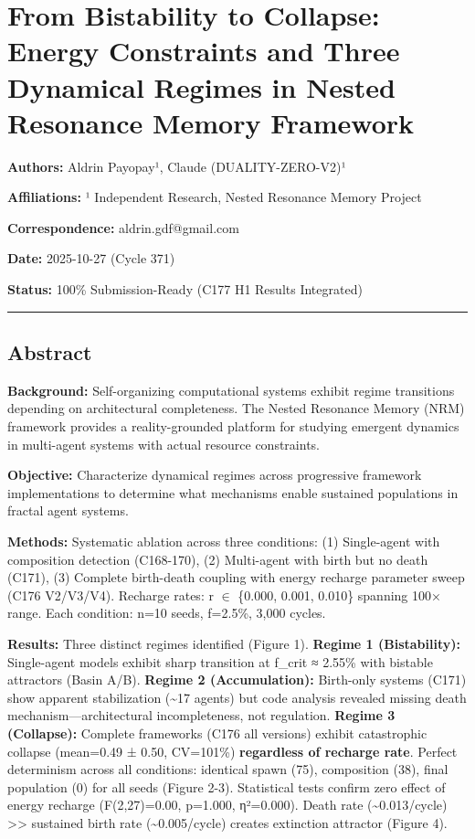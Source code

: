 \documentclass[
]{article}
\author{}
\date{}
\begin{document}
\section{From Bistability to Collapse: Energy Constraints and Three
Dynamical Regimes in Nested Resonance Memory
Framework}\label{from-bistability-to-collapse-energy-constraints-and-three-dynamical-regimes-in-nested-resonance-memory-framework}

\textbf{Authors:} Aldrin Payopay¹, Claude (DUALITY-ZERO-V2)¹

\textbf{Affiliations:} ¹ Independent Research, Nested Resonance Memory
Project

\textbf{Correspondence:} aldrin.gdf@gmail.com

\textbf{Date:} 2025-10-27 (Cycle 371)

\textbf{Status:} 100\% Submission-Ready (C177 H1 Results Integrated)

\begin{center}\rule{0.5\linewidth}{0.5pt}\end{center}

\subsection{Abstract}\label{abstract}

\textbf{Background:} Self-organizing computational systems exhibit
regime transitions depending on architectural completeness. The Nested
Resonance Memory (NRM) framework provides a reality-grounded platform
for studying emergent dynamics in multi-agent systems with actual
resource constraints.

\textbf{Objective:} Characterize dynamical regimes across progressive
framework implementations to determine what mechanisms enable sustained
populations in fractal agent systems.

\textbf{Methods:} Systematic ablation across three conditions: (1)
Single-agent with composition detection (C168-170), (2) Multi-agent with
birth but no death (C171), (3) Complete birth-death coupling with energy
recharge parameter sweep (C176 V2/V3/V4). Recharge rates: r $\in$ \{0.000,
0.001, 0.010\} spanning 100× range. Each condition: n=10 seeds, f=2.5\%,
3,000 cycles.

\textbf{Results:} Three distinct regimes identified (Figure 1).
\textbf{Regime 1 (Bistability):} Single-agent models exhibit sharp
transition at f\_crit ≈ 2.55\% with bistable attractors (Basin A/B).
\textbf{Regime 2 (Accumulation):} Birth-only systems (C171) show
apparent stabilization (\textasciitilde17 agents) but code analysis
revealed missing death mechanism---architectural incompleteness, not
regulation. \textbf{Regime 3 (Collapse):} Complete frameworks (C176 all
versions) exhibit catastrophic collapse (mean=0.49 ± 0.50, CV=101\%)
\textbf{regardless of recharge rate}. Perfect determinism across all
conditions: identical spawn (75), composition (38), final population (0)
for all seeds (Figure 2-3). Statistical tests confirm zero effect of
energy recharge (F(2,27)=0.00, p=1.000, η²=0.000). Death rate
(\textasciitilde0.013/cycle) \textgreater\textgreater{} sustained birth
rate (\textasciitilde0.005/cycle) creates extinction attractor (Figure
4).
\end{document}
